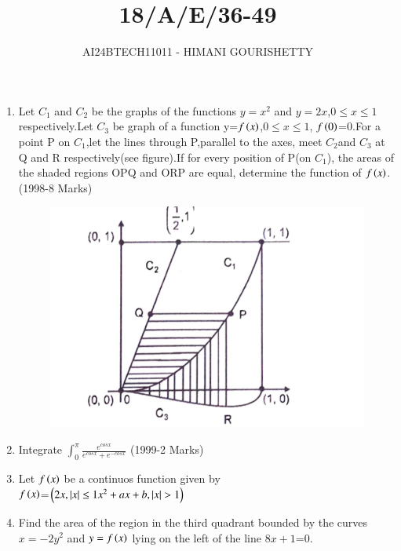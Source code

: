 \documentclass[journal,12pt,twocolumn]{IEEEtran}
\theoremstyle{remark}
\begin{document}

\vspace{3cm}

\title{18/A/E/36-49}
\author{AI24BTECH11011 - HIMANI GOURISHETTY}
\maketitle
\newpage
\bigskip

\renewcommand{\thefigure}{\theenumi}
\renewcommand{\thetable}{\theenumi}

\begin{enumerate}
	\item Let $C_1$ and $C_2$ be the graphs of the functions $y=x^2$ and $y=2x$,$0\le x\le1$ respectively.Let $C_3$ be graph of a function  y=$f\left(x\right)$,$0\le x \le 1$, $f\left(0\right)$=0.For a point P on $C_1$,let the lines through P,parallel to the axes, meet $C_2$and $C_3$ at Q and R respectively(see figure).If for every position of P(on $C_1$), the areas of the shaded regions OPQ and ORP are equal, determine the function of $f\left(x\right)$.
\hfill{(1998-8 Marks)}
\begin{figure}[h!]
\centering
\includegraphics[width=1\linewidth]{figs/fig1.png}
\label{fig:11011}
\end{figure}		        
\item Integrate $\int_{0}^{\pi}\frac{e^{cosx}}{e^{cosx}+e^{-cosx}}$
\hfill{(1999-2 Marks)}\\	      			
\item Let $f\left(x\right)$ be a continuos function given by \\
$f\left(x\right)$=$\left(2x, \left\vert x\right\vert\le1  x^2+ax+b, \left\vert x\right\vert>1\right)$
\item Find the area of the region in the third quadrant bounded by the curves $x=-2y^2$ and $y=f\left(x\right)$ lying on the left of the line $8x+1$=0. 						

\end{enumerate}
\end{document}
